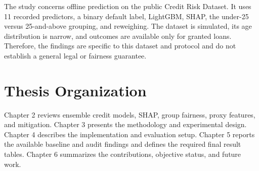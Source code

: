The study concerns offline prediction on the public Credit Risk Dataset. It
uses 11 recorded predictors, a binary default label, LightGBM, SHAP, the
under-25 versus 25-and-above grouping, and reweighing. The dataset is
simulated, its age distribution is narrow, and outcomes are available only for
granted loans. Therefore, the findings are specific to this dataset and
protocol and do not establish a general legal or fairness guarantee.

\section{Thesis Organization}

Chapter 2 reviews ensemble credit models, SHAP, group fairness, proxy
features, and mitigation. Chapter 3 presents the methodology and experimental
design. Chapter 4 describes the implementation and evaluation setup. Chapter
5 reports the available baseline and audit findings and defines the required
final result tables. Chapter 6 summarizes the contributions, objective status,
and future work.
